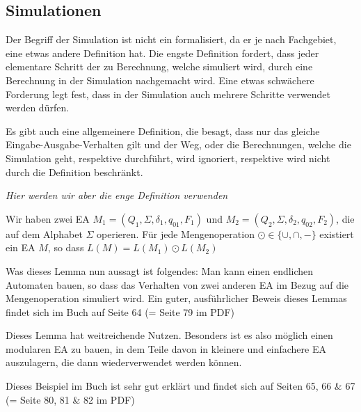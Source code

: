 \newpage
\subsection{Simulationen}
Der Begriff der Simulation ist nicht ein formalisiert, da er je nach Fachgebiet, eine etwas andere Definition hat.
Die engste Definition fordert, dass jeder elementare Schritt der zu Berechnung, welche simuliert wird, durch eine Berechnung in der Simulation nachgemacht wird.
Eine etwas schwächere Forderung legt fest, dass in der Simulation auch mehrere Schritte verwendet werden dürfen.

Es gibt auch eine allgemeinere Definition, die besagt, dass nur das gleiche Eingabe-Ausgabe-Verhalten gilt und der Weg, oder die Berechnungen, welche die Simulation geht, respektive durchführt, wird ignoriert, respektive wird nicht durch die Definition beschränkt.

\textit{Hier werden wir aber die enge Definition verwenden}

\inlinelemma Wir haben zwei EA $M_1 = (Q_1, \Sigma, \delta_1, q_{01}, F_1)$ und $M_2 = (Q_2, \Sigma, \delta_2, q_{02}, F_2)$, die auf dem Alphabet $\Sigma$ operieren.
Für jede Mengenoperation $\odot \in \{ \cup, \cap, - \}$ existiert ein EA $M$, so dass $L(M) = L(M_1) \odot L(M_2)$

Was dieses Lemma nun aussagt ist folgendes: Man kann einen endlichen Automaten bauen, so dass das Verhalten von zwei anderen EA im Bezug auf die Mengenoperation simuliert wird.
Ein guter, ausführlicher Beweis dieses Lemmas findet sich im Buch auf Seite 64 (= Seite 79 im PDF)

Dieses Lemma hat weitreichende Nutzen. Besonders ist es also möglich einen modularen EA zu bauen, in dem Teile davon in kleinere und einfachere EA auszulagern, die dann wiederverwendet werden können.

\inlineex Dieses Beispiel im Buch ist sehr gut erklärt und findet sich auf Seiten 65, 66 \& 67 (= Seite 80, 81 \& 82 im PDF)
